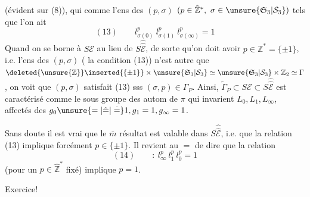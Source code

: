 (évident sur (8)), qui  comme l'ens des $(p,\sigma)$ $(p\in\hat{\mathbb Z}^*,\ \sigma\in\unsure{\mathfrak S_3|\mathcal S_3})$ tels que l'on ait
\[
(13)\qquad l_{\sigma(0)}^p\ l_{\sigma(1)}^p\ l_{\sigma(\infty)}^p=1
\]
Quand on se borne à $S\mathcal E$ au lieu de $S\widehat{\widehat{\mathcal E}}$, de sorte qu'on doit avoir $p\in\mathbb Z^*=\{\pm1\}$,  i.e. l'ens des $(p,\sigma)$ ( la condition (13)) n'est autre que $\deleted{\unsure{\mathbb Z}}\inserted{\{\pm1\}}\times\unsure{\mathfrak S_3|\mathcal S_3}\simeq\unsure{\mathfrak S_3|\mathcal S_3}\times\mathbb Z_2\simeq\Gamma$, on voit que $(p,\sigma)$ satisfait (13) sss $(\sigma,p)\in\Gamma_P$. Ainsi, $\tilde\Gamma_P\subset S\mathcal E\subset S\widehat{\widehat{\mathcal E}}$ est caractérisé comme le sous groupe  des autom de $\pi$  qui invarient $L_0,L_1,L_\infty$, affectés des  $g_0\unsure{=|\hat{=}|\overset{\cdot}{=}}1,g_1=1,g_\infty=1$.

Sans doute il est vrai que le $\bar m$ résultat est valable dans $S\widehat{\widehat{\mathcal E}}$, i.e. que la relation (13) implique forcément $p\in\{\pm1\}$. Il revient au $=$ de dire  que la relation
\[
(14)\qquad :\ l_\infty^p\ l_1^p\ l_0^p=1
\]
(pour un $p\in\hat{\mathbb Z}^*$ fixé) implique $p=1$.

Exercice!
